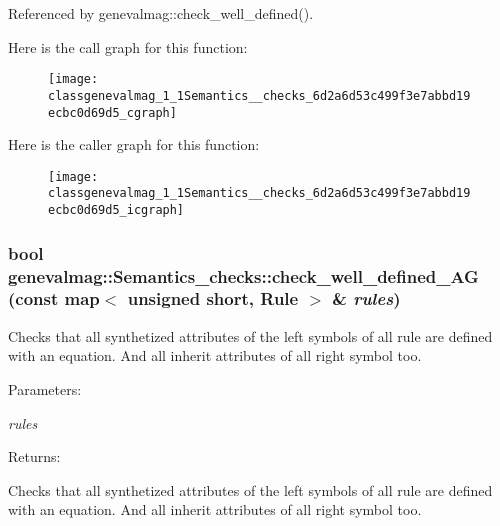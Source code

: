 Referenced by genevalmag::check\_\-well\_\-defined().

Here is the call graph for this function:\nopagebreak
\begin{figure}[H]
\begin{center}
\leavevmode
\texttt{[image: classgenevalmag\_1\_1Semantics\_\_checks\_6d2a6d53c499f3e7abbd19ecbc0d69d5\_cgraph]}
\end{center}
\end{figure}


Here is the caller graph for this function:\nopagebreak
\begin{figure}[H]
\begin{center}
\leavevmode
\texttt{[image: classgenevalmag\_1\_1Semantics\_\_checks\_6d2a6d53c499f3e7abbd19ecbc0d69d5\_icgraph]}
\end{center}
\end{figure}
\hypertarget{classgenevalmag_1_1Semantics__checks_7234750d25c375989dfc9318e081571d}{
\subsubsection[{check\_\-well\_\-defined\_\-AG}]{\setlength{\rightskip}{0pt plus 5cm}bool genevalmag::Semantics\_\-checks::check\_\-well\_\-defined\_\-AG (const map$<$ unsigned short, {\bf Rule} $>$ \& {\em rules})}}
\label{classgenevalmag_1_1Semantics__checks_7234750d25c375989dfc9318e081571d}


Checks that all synthetized attributes of the left symbols of all rule are defined with an equation. And all inherit attributes of all right symbol too.

\begin{Desc}
\item[Parameters:]
\begin{description}
\item[{\em rules}]\end{description}
\end{Desc}
\begin{Desc}
\item[Returns:]\end{Desc}
Checks that all synthetized attributes of the left symbols of all rule are defined with an equation. And all inherit attributes of all right symbol too. 

